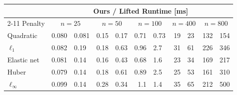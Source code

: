 \begin{tabular}{lr@{\,/\,}lr@{\,/\,}lr@{\,/\,}lr@{\,/\,}lr@{\,/\,}l}
\toprule
& \multicolumn{10}{c}{Ours / Lifted Runtime [ms]} \\
\cmidrule(lr){2-11}
Penalty & \multicolumn{2}{c}{$n=25$} & \multicolumn{2}{c}{$n=50$} & \multicolumn{2}{c}{$n=100$} & \multicolumn{2}{c}{$n=400$} & \multicolumn{2}{c}{$n=800$} \\
\midrule
Quadratic & 0.080 & 0.081 & 0.15 & 0.17 & 0.71 & 0.73 & 19 & 23 & 132 & 154 \\
$\ell_1$ & 0.082 & 0.19 & 0.18 & 0.63 & 0.96 & 2.7 & 31 & 61 & 226 & 346 \\
Elastic net & 0.081 & 0.14 & 0.16 & 0.43 & 0.68 & 1.6 & 23 & 34 & 169 & 217 \\
Huber & 0.079 & 0.14 & 0.18 & 0.61 & 0.89 & 2.5 & 25 & 53 & 161 & 310 \\
$\ell_\infty$ & 0.099 & 0.14 & 0.28 & 0.34 & 1.1 & 1.4 & 35 & 65 & 212 & 500 \\
\bottomrule
\end{tabular}
